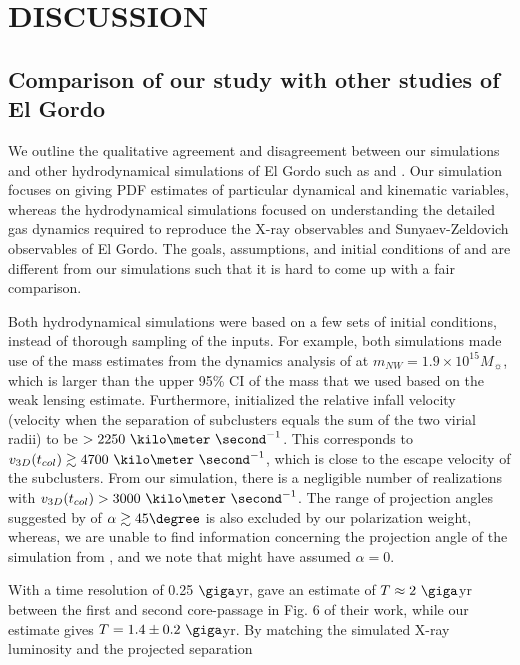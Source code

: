\section{DISCUSSION}
\subsection{Comparison of our study with other studies of El Gordo}
We outline the qualitative agreement and disagreement between our
simulations and other hydrodynamical simulations of El Gordo such as
\cite{Donnert13} and \cite{Molnar14}. Our simulation focuses on giving PDF
estimates of particular dynamical and kinematic variables, whereas the
hydrodynamical simulations focused on understanding the detailed gas dynamics
required to reproduce the X-ray observables and Sunyaev-Zeldovich
observables of El Gordo. The goals,
assumptions, and initial conditions of \cite{Donnert13} and \cite{Molnar14}
are different from our simulations such that it is hard to come up with a
fair comparison. \par 
Both hydrodynamical simulations were based on a few sets of initial
conditions, instead of thorough sampling of the inputs. For example, both
simulations made use of the mass estimates from the dynamics analysis
of  at $m_{NW} = 1.9 \times
10^{15} M_{\sun}$,
which is larger than the upper 95\% CI of the mass that we used based on
the weak lensing estimate.
Furthermore, \cite{Molnar14} initialized the relative infall velocity
(velocity when the separation of subclusters equals the sum of the two virial
radii) to be $> 2250~\kilo \meter~ \second^{-1}$. This corresponds to
$v_{3D}(t_{col}) \gtrsim 4700~\kilo \meter~\second^{-1}$, which is close to
the escape velocity of the subclusters. From our simulation, there is a
negligible number of realizations with $v_{3D}(t_{col}) >
3000~\kilo\meter~\second^{-1}$. The range of projection angles suggested by
\cite{Molnar14} of $\alpha \gtrsim 45\degree$ is also excluded by our
polarization weight, whereas, we are unable to find information concerning
the projection angle of the simulation from \cite{Donnert13}, and we note
that \cite{Donnert13}
might have assumed $\alpha = 0$. \par 
With a time resolution of 0.25 $\giga$yr,
\cite{Donnert13} gave an estimate of  $T\approx 2~\giga$yr between the
first and second core-passage in Fig. 6 of their work, while our estimate gives $T
= 1.4\pm {0.2}~\giga$yr. 
By matching the simulated X-ray luminosity and the projected separation

